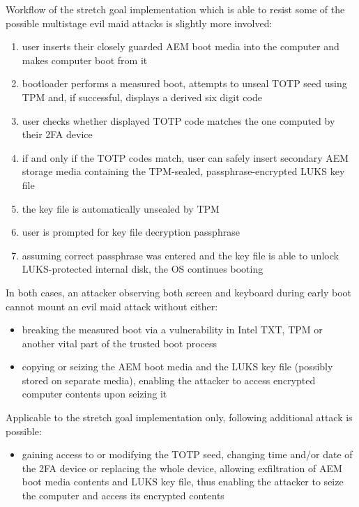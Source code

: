 \documentclass[10pt,a4paper,twocolumn]{article}
\begin{document}
Workflow of the stretch goal implementation which is able to resist some of the
possible multistage evil maid attacks is slightly more involved:
\begin{enumerate}
  \item user inserts their closely guarded AEM boot media into the computer and
    makes computer boot from it
  \item bootloader performs a measured boot, attempts to unseal TOTP seed using
    TPM and, if successful, displays a derived six digit code
  \item user checks whether displayed TOTP code matches the one computed by
    their 2FA device
  \item if and only if the TOTP codes match, user can safely insert secondary
    AEM storage media containing the TPM-sealed, passphrase-encrypted LUKS key
    file
  \item the key file is automatically unsealed by TPM
  \item user is prompted for key file decryption passphrase
  \item assuming correct passphrase was entered and the key file is able to
    unlock LUKS-protected internal disk, the OS continues booting
\end{enumerate}

In both cases, an attacker observing both screen and keyboard during early boot
cannot mount an evil maid attack without either:
\begin{itemize}
  \item breaking the measured boot via a vulnerability in Intel TXT, TPM or
    another vital part of the trusted boot process
  \item copying or seizing the AEM boot media and the LUKS key file (possibly
    stored on separate media), enabling the attacker to access encrypted
    computer contents upon seizing it
\end{itemize}

Applicable to the stretch goal implementation only, following additional attack
is possible:
\begin{itemize}
  \item gaining access to or modifying the TOTP seed, changing time and/or date
    of the 2FA device or replacing the whole device, allowing exfiltration of
    AEM boot media contents and LUKS key file, thus enabling the attacker to
    seize the computer and access its encrypted contents
\end{itemize}
\end{document}
